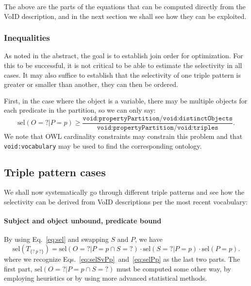 \documentclass[12pt, draft]{article}
\newcommand{\rdfterm}[1]{\texttt{#1}}
\newcommand{\sel}[1]{\ensuremath{\mathrm{sel}\left(#1\right)}}
\begin{document}
The above are the parts of the equations that can be computed directly
from the VoID description, and in the next section we shall see how
they can be exploited.

\subsubsection{Inequalities}

As noted in the abstract, the goal is to establish join order for
optimization. For this to be successful, it is not critical to be able
to estimate the selectivity in all cases. It may also suffice to
establish that the selectivity of one triple pattern is greater or
smaller than another, they can then be ordered.

First, in the case where the object is a variable, there may be multiple
objects for each predicate in the partition, so we can only say:
\begin{equation}\label{eq:selOvPp}
 \sel{O = ? | P = p} \ge
   \frac{\rdfterm{void:propertyPartition/void:distinctObjects}}{\rdfterm{void:propertyPartition/void:triples}} .
\end{equation}
We note that OWL cardinality constraints may constrain this problem
and that \rdfterm{void:vocabulary} may be used to find the
corresponding ontology.

 
\subsection{Triple pattern cases}

We shall now systematically go through different triple patterns and
see how the selectivity can be derived from VoID descriptions per the
most recent vocabulary\cite{voidnote}:



\paragraph{Subject and object unbound, predicate bound}

By using Eq.~\ref{eq:sel} and swapping $S$ and $P$, we have 
\begin{equation}\label{eq:selsuobunpb}
\sel{T_{\{?~p~?\}}} = \sel{O = ? | P = p \cap S = ?} \cdot 
\sel{S = ? | P = p} \cdot
\sel{P = p} . 
\end{equation}
where we recognize Eqs.~\ref{eq:selSvPp}~and~\ref{eq:selPp} as the
last two parts. The first part, $\sel{O = ? | P = p \cap S = ?}$ must
be computed some other way, by employing heuristics or by using more
advanced statistical methods. 
\end{document}
